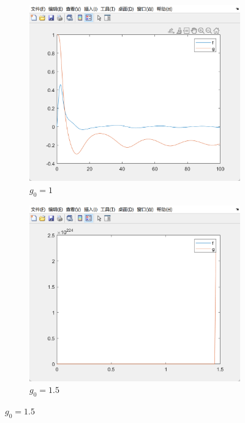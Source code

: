 \documentclass[11pt]{ctexart}
\begin{document}
\begin{figure}[H]
        \begin{subfigure}[h]{0.4\textwidth}
            \includegraphics[width=\textwidth]{picture/exp3_1_3}
            \caption{\(g_0=1\)}
        \end{subfigure}
        \begin{subfigure}[h]{0.4\textwidth}
            \includegraphics[width=\textwidth]{picture/exp3_1_4}
            \caption{\(g_0=1.5\)}
        \end{subfigure}
        \label{fig:}
    \end{figure}
\end{document}
